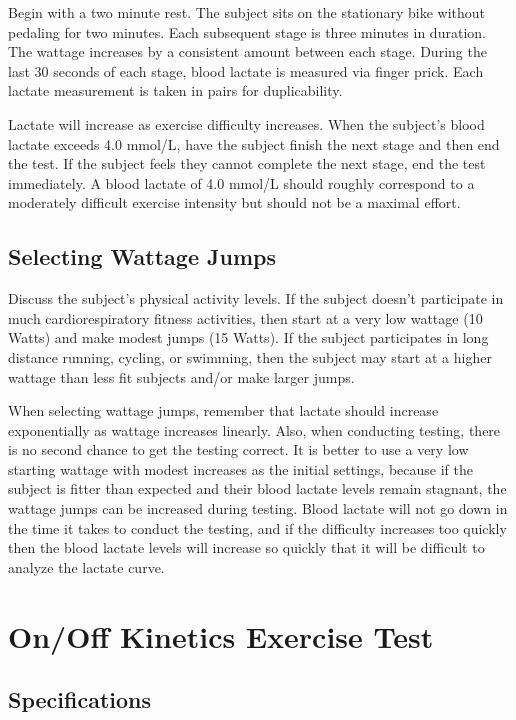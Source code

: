 \documentclass[
]{book}
\begin{document}
Begin with a two minute rest. The subject sits on the stationary bike without pedaling for two minutes.
Each subsequent stage is three minutes in duration. The wattage increases by a consistent amount between each stage. During the last 30 seconds of each stage, blood lactate is measured via finger prick. Each lactate measurement is taken in pairs for duplicability.

Lactate will increase as exercise difficulty increases. When the subject's blood lactate exceeds 4.0 mmol/L, have the subject finish the next stage and then end the test. If the subject feels they cannot complete the next stage, end the test immediately. A blood lactate of 4.0 mmol/L should roughly correspond to a moderately difficult exercise intensity but should not be a maximal effort.

\hypertarget{ExerciseTesting-LT-Watts}{%
\subsection{Selecting Wattage Jumps}\label{ExerciseTesting-LT-Watts}}

Discuss the subject's physical activity levels. If the subject doesn't participate in much cardiorespiratory fitness activities, then start at a very low wattage (10 Watts) and make modest jumps (15 Watts). If the subject participates in long distance running, cycling, or swimming, then the subject may start at a higher wattage than less fit subjects and/or make larger jumps.

When selecting wattage jumps, remember that lactate should increase exponentially as wattage increases linearly. Also, when conducting testing, there is no second chance to get the testing correct. It is better to use a very low starting wattage with modest increases as the initial settings, because if the subject is fitter than expected and their blood lactate levels remain stagnant, the wattage jumps can be increased during testing. Blood lactate will not go down in the time it takes to conduct the testing, and if the difficulty increases too quickly then the blood lactate levels will increase so quickly that it will be difficult to analyze the lactate curve.

\hypertarget{ExerciseTesting-Onoff}{%
\section{On/Off Kinetics Exercise Test}\label{ExerciseTesting-Onoff}}

\hypertarget{ExerciseTesting-Onoff-Specs}{%
\subsection{Specifications}\label{ExerciseTesting-Onoff-Specs}}
\end{document}
